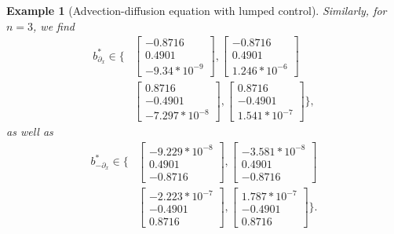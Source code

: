 \documentclass[journal,twoside,web]{ieeecolor}
\newcommand{\del}{\partial}
\newtheorem{example}{Example}
\begin{document}
\begin{example}[Advection-diffusion equation with lumped control]
	Similarly, for $n=3$, we find
	\begin{align} \label{eq: max.ex.2.2}
	b^*_{\del_x} \in \Bigg\{&\begin{bmatrix}-0.8716\\0.4901\\-9.34*10^{-9}\end{bmatrix}, \begin{bmatrix}-0.8716\\0.4901\\1.246*10^{-6}\end{bmatrix}\\
	&\begin{bmatrix}0.8716\\-0.4901\\-7.297*10^{-8}\end{bmatrix}, \begin{bmatrix} 0.8716\\-0.4901\\1.541*10^{-7}\end{bmatrix}\Bigg\},\nonumber
	\end{align}
	as well as 
	\begin{align} \label{eq: max.ex.2.2.1}
	b^*_{-\del_x} \in \Bigg\{&\begin{bmatrix}-9.229*10^{-8}\\0.4901\\ -0.8716\end{bmatrix}, \begin{bmatrix}-3.581*10^{-8}\\0.4901\\ -0.8716\end{bmatrix}\\
	&\begin{bmatrix}-2.223*10^{-7}\\-0.4901\\0.8716\end{bmatrix}, \begin{bmatrix}1.787*10^{-7}\\-0.4901\\0.8716\end{bmatrix}\Bigg\}\nonumber.
	\end{align}
	

\end{example}
\end{document}
